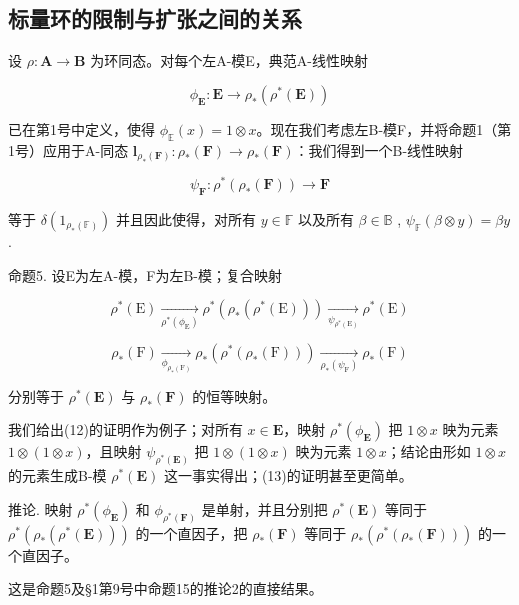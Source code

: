 \subsection{标量环的限制与扩张之间的关系}

设 \(\rho: \mathbf{A} \to \mathbf{B}\) 为环同态。对每个左A-模E，典范A-线性映射

\[
\phi_ {\mathbf {E}}: \mathbf {E} \rightarrow \rho_ {*} (\rho^ {*} (\mathbf {E}))\tag{10}
\]

已在第1号中定义，使得 \(\phi_{\mathbb{E}}(x) = 1 \otimes x\)。现在我们考虑左B-模F，并将命题1（第1号）应用于A-同态 \(\mathbf{l}_{\rho_{*}(\mathbf{F})}: \rho_{*}(\mathbf{F}) \to \rho_{*}(\mathbf{F})\)：我们得到一个B-线性映射

\[
\psi_ {\mathbf {F}} \colon \rho^ {*} (\rho_ {*} (\mathbf {F})) \rightarrow \mathbf {F}\tag{11}
\]

等于 \(\delta(1_{\rho_*(\mathbb{F})})\) 并且因此使得，对所有 \(y \in \mathbb{F}\) 以及所有 \(\beta \in \mathbb{B}\) , \(\psi_{\mathbb{F}}(\beta \otimes y) = \beta y\) .

命题5. 设E为左A-模，F为左B-模；复合映射

\[
\rho^ {*} (\mathrm{E}) \xrightarrow [ \rho^ {*} (\phi_ {\mathrm{E}}) ]{} \rho^ {*} (\rho_ {*} (\rho^ {*} (\mathrm{E}))) \xrightarrow [ \psi_ {\rho^ {*} (\mathrm{E})} ]{} \rho^ {*} (\mathrm{E})\tag{12}
\]

\[
\rho_ {*} (\mathrm{F}) \xrightarrow [ \phi_ {\rho_ {*} (\mathrm{F})} ]{} \rho_ {*} (\rho^ {*} (\rho_ {*} (\mathrm{F}))) \xrightarrow [ \rho_ {*} (\psi_ {\mathrm{F}}) ]{} \rho_ {*} (\mathrm{F})\tag{13}
\]

分别等于 \(\rho^{*}(\mathbf{E})\) 与 \(\rho_{*}(\mathbf{F})\) 的恒等映射。

我们给出(12)的证明作为例子；对所有 \(x \in \mathbf{E}\)，映射 \(\rho^{*}(\phi_{\mathbf{E}})\) 把 \(1 \otimes x\) 映为元素 \(1 \otimes (1 \otimes x)\)，且映射 \(\psi_{\rho^{*}(\mathbf{E})}\) 把 \(1 \otimes (1 \otimes x)\) 映为元素 \(1 \otimes x\)；结论由形如 \(1 \otimes x\) 的元素生成B-模 \(\rho^{*}(\mathbf{E})\) 这一事实得出；(13)的证明甚至更简单。

推论. 映射 \(\rho^{*}(\phi_{\mathbf{E}})\) 和 \(\phi_{\rho^{*}(\mathbf{F})}\) 是单射，并且分别把 \(\rho^{*}(\mathbf{E})\) 等同于 \(\rho^{*}(\rho_{*}(\rho^{*}(\mathbf{E})))\) 的一个直因子，把 \(\rho_{*}(\mathbf{F})\) 等同于 \(\rho_{*}(\rho^{*}(\rho_{*}(\mathbf{F})))\) 的一个直因子。

这是命题5及§1第9号中命题15的推论2的直接结果。


